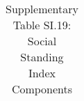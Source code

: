 \begin{longtable}{llcccccccccc}
\caption{Supplementary Table SI.19: Social Standing Index Components} \label{tab:pap__b4_2b} \\                                                                                                                                                                                                                                                                                                                                                                                                                                                                                                                                                                                                                                                                                                                                                                                           
\hline \hline                                                                                                                                                                                                                                                                                                                                                                                                                                                                                                                                                                                                                                                                                                                                                                                                                                                                             

\end{longtable}
